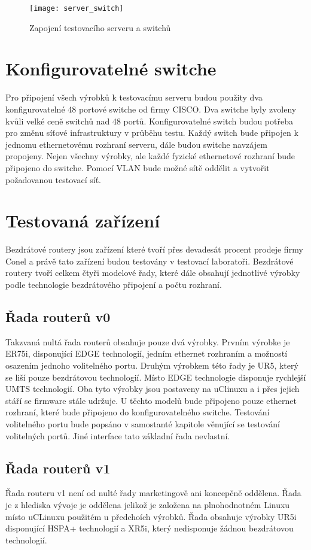 \begin{figure}[h]
  \centering
  \texttt{[image: server\_switch]}
  \caption{Zapojení testovacího serveru a switchů}
  \label{fig:server_switch}
\end{figure}

\section{Konfigurovatelné switche}
Pro připojení všech výrobků k testovacímu serveru budou použity dva konfigurovatelné 48 portové switche od firmy CISCO. Dva switche byly zvoleny kvůli velké ceně switchů nad 48 portů. Konfigurovatelné switch budou potřeba pro změnu síťové infrastruktury v průběhu testu. Každý switch bude připojen k jednomu ethernetovému rozhraní serveru, dále budou switche navzájem propojeny. Nejen všechny výrobky, ale každé fyzické ethernetové rozhraní bude připojeno do switche. Pomocí VLAN bude možné sítě oddělit a vytvořit požadovanou testovací síť.

\section{Testovaná zařízení}
Bezdrátové routery jsou zařízení které tvoří přes devadesát procent prodeje firmy Conel a právě tato zařízení budou testovány v testovací laboratoři. Bezdrátové routery tvoří celkem čtyři modelové řady, které dále obsahují jednotlivé výrobky podle technologie bezdrátového připojení a počtu rozhraní.

\subsection{Řada routerů v0}
Takzvaná nultá řada routerů obsahuje pouze dvá výrobky. Prvním výrobke je ER75i, disponující EDGE technologií, jedním ethernet rozhraním a možností osazením jednoho volitelného portu. Druhým výrobkem této řady je UR5, který se liší pouze bezdrátovou technologií. Místo EDGE technologie disponuje rychlejší UMTS technologií. Oba tyto výrobky jsou postaveny na uClinuxu a i přes jejich stáří se firmware stále udržuje. U těchto modelů bude připojeno pouze ethernet rozhraní, které bude připojeno do konfigurovatelného switche. Testování volitelného portu bude popsáno v samostanté kapitole věnující se testování volitelných portů. Jiné interface tato základní řada nevlastní.

\subsection{Řada routerů v1}
Řada routeru v1 není od nulté řady marketingově ani koncepčně oddělena. Řada je z hlediska vývoje je oddělena jelikož je založena na plnohodnotném Linuxu místo uCLinuxu použitém u předchoích výrobků. Řada obsahuje výrobky UR5i disponující HSPA+ technologií a XR5i, který nedisponuje žádnou bezdrátovou technologií.

